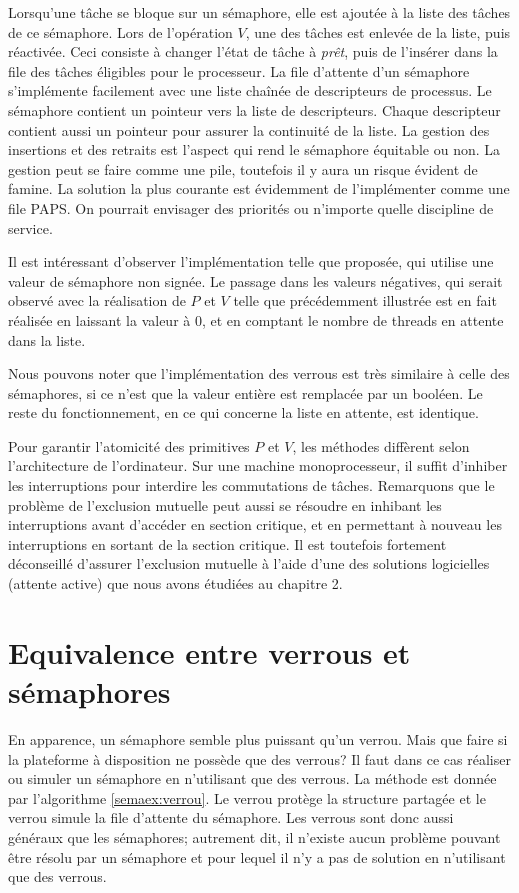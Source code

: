 Lorsqu'une tâche se bloque sur un sémaphore, elle est ajoutée à la liste des tâches de ce sémaphore. Lors de l'opération $V$, une des tâches est enlevée de la liste, puis réactivée. Ceci consiste à changer l'état de tâche à {\em prêt}, puis de l'insérer dans la file des tâches éligibles pour le processeur. La file d'attente d'un sémaphore s'implémente facilement avec une liste chaînée de descripteurs de processus. Le sémaphore contient un pointeur vers la liste de descripteurs.  Chaque descripteur contient aussi un pointeur pour assurer la continuité de la liste. La gestion des insertions et des retraits est l'aspect qui rend le sémaphore équitable ou non.  La gestion peut se faire comme une pile, toutefois il y aura un risque évident de famine.  La solution la plus courante est évidemment de l'implémenter comme une file PAPS.  On pourrait envisager des priorités ou n'importe quelle discipline de service.
\par
Il est intéressant d'observer l'implémentation telle que proposée, qui utilise une valeur de sémaphore non signée. Le passage dans les valeurs négatives, qui serait observé avec la réalisation de $P$ et $V$ telle que précédemment illustrée est en fait réalisée en laissant la valeur à 0, et en comptant le nombre de threads en attente dans la liste.
\par
Nous pouvons noter que l'implémentation des verrous est très similaire à celle des sémaphores, si ce n'est que la valeur entière est remplacée par un booléen. Le reste du fonctionnement, en ce qui concerne la liste en attente, est identique.
\par
Pour garantir l'atomicité des primitives $P$ et $V$, les méthodes diffèrent selon l'architecture de l'ordinateur.
Sur une machine monoprocesseur, il suffit d'inhiber les interruptions pour interdire les commutations de tâches.  Remarquons que le problème de l'exclusion mutuelle peut aussi se résoudre en inhibant les interruptions avant d'accéder en section critique, et en permettant à nouveau les interruptions en sortant de la section critique.
Il est toutefois fortement déconseillé d'assurer l'exclusion mutuelle à l'aide d'une des solutions logicielles (attente active) que nous avons étudiées au chapitre 2.

\section{Equivalence entre verrous et sémaphores}
En apparence, un sémaphore semble plus puissant qu'un verrou. Mais que faire si la plateforme à disposition ne possède que des verrous? Il faut dans ce cas réaliser ou simuler un sémaphore en n'utilisant que des verrous. La méthode est donnée par l'algorithme \ref{semaex:verrou}. Le verrou  protège la structure partagée  et le verrou  simule la file d'attente du sémaphore.
Les verrous sont donc aussi généraux que les sémaphores; autrement dit, il n'existe aucun problème pouvant être résolu par un sémaphore et pour lequel il n'y a pas de solution en n'utilisant que des verrous.

